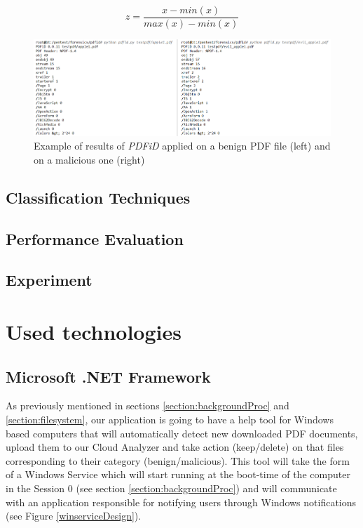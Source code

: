 \begin{equation}
	\label{eq:1}
	z = \frac{x - min(x)}{max(x) - min(x)}
\end{equation}

\begin{figure}[H]
	\centerline{\includegraphics[scale=0.6]{figures/pdfidoutput.png}}  
	\caption{Example of results of \textit{PDFiD} applied on a benign PDF file (left) and on a malicious one (right)}
	\label{pdfidoutput}
\end{figure}

\subsection{Classification Techniques}
\subsection{Performance Evaluation}
\subsection{Experiment}     %

\section{Used technologies}
\label{section:technologies}
\subsection{Microsoft .NET Framework}
As previously mentioned in sections \ref{section:backgroundProc} and \ref{section:filesystem}, our application is going to have a help tool for Windows based computers that will automatically detect new downloaded PDF documents, upload them to our Cloud Analyzer and take action (keep/delete) on that files corresponding to their category (benign/malicious). This tool will take the form of a Windows Service which will start running at the boot-time of the computer in the Session 0 (see section \ref{section:backgroundProc}) and will communicate with an application responsible for notifying users through Windows notifications (see Figure \ref{winserviceDesign}). 

